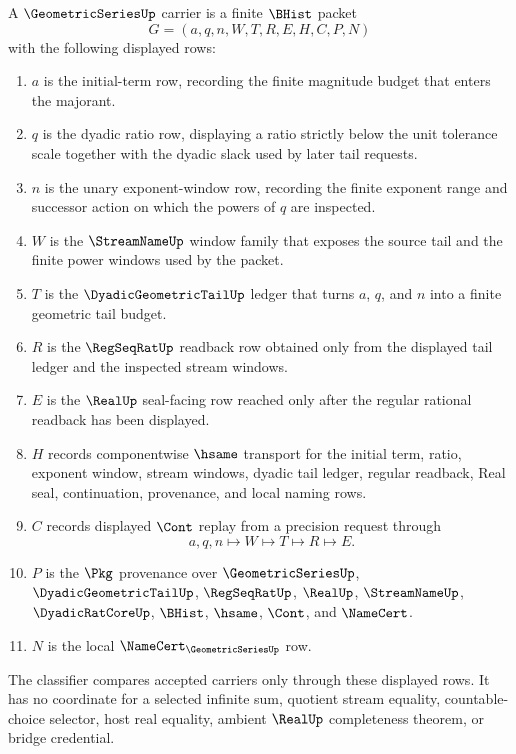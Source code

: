 \begin{definition}
\label{def:geometric-series-carrier}
A $\GeometricSeriesUp$ carrier is a finite $\BHist$ packet
$$
G=(a,q,n,W,T,R,E,H,C,P,N)
$$
with the following displayed rows:
\begin{enumerate}
\item $a$ is the initial-term row, recording the finite magnitude budget that enters the majorant.
\item $q$ is the dyadic ratio row, displaying a ratio strictly below the unit tolerance scale together with the dyadic slack used by later tail requests.
\item $n$ is the unary exponent-window row, recording the finite exponent range and successor action on which the powers of $q$ are inspected.
\item $W$ is the $\StreamNameUp$ window family that exposes the source tail and the finite power windows used by the packet.
\item $T$ is the $\DyadicGeometricTailUp$ ledger that turns $a$, $q$, and $n$ into a finite geometric tail budget.
\item $R$ is the $\RegSeqRatUp$ readback row obtained only from the displayed tail ledger and the inspected stream windows.
\item $E$ is the $\RealUp$ seal-facing row reached only after the regular rational readback has been displayed.
\item $H$ records componentwise $\hsame$ transport for the initial term, ratio, exponent window, stream windows, dyadic tail ledger, regular readback, Real seal, continuation, provenance, and local naming rows.
\item $C$ records displayed $\Cont$ replay from a precision request through
$$
a,q,n\longmapsto W\longmapsto T\longmapsto R\longmapsto E .
$$
\item $P$ is the $\Pkg$ provenance over $\GeometricSeriesUp$, $\DyadicGeometricTailUp$, $\RegSeqRatUp$, $\RealUp$, $\StreamNameUp$, $\DyadicRatCoreUp$, $\BHist$, $\hsame$, $\Cont$, and $\NameCert$.
\item $N$ is the local $\NameCert_{\GeometricSeriesUp}$ row.
\end{enumerate}
The classifier compares accepted carriers only through these displayed rows. It has no coordinate for a selected infinite sum, quotient stream equality, countable-choice selector, host real equality, ambient $\RealUp$ completeness theorem, or bridge credential.
\end{definition}

